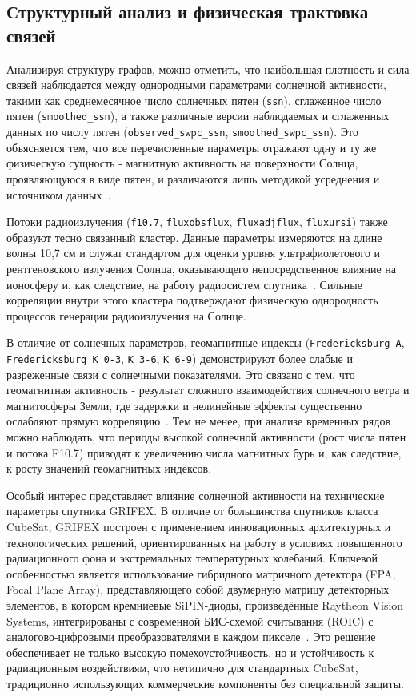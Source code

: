 \subsection{Структурный анализ и физическая трактовка связей}

Анализируя структуру графов, можно отметить, что наибольшая плотность и сила
связей наблюдается между однородными параметрами солнечной активности, такими
как среднемесячное число солнечных пятен (\texttt{ssn}), сглаженное число пятен
(\texttt{smoothed\_ssn}), а также различные версии наблюдаемых и сглаженных
данных по числу пятен (\texttt{observed\_swpc\_ssn},
\texttt{smoothed\_swpc\_ssn}). Это объясняется тем, что все перечисленные
параметры отражают одну и ту же физическую сущность - магнитную активность на
поверхности Солнца, проявляющуюся в виде пятен, и различаются лишь методикой
усреднения и источником данных~\cite{sidc_manual}.

Потоки радиоизлучения (\texttt{f10.7}, \texttt{fluxobsflux},
\texttt{fluxadjflux}, \texttt{fluxursi}) также образуют тесно связанный кластер.
Данные параметры измеряются на длине волны 10,7 см и служат стандартом для
оценки уровня ультрафиолетового и рентгеновского излучения Солнца, оказывающего
непосредственное влияние на ионосферу и, как следствие, на работу радиосистем
спутника~\cite{f107_standard}. Сильные корреляции внутри этого кластера
подтверждают физическую однородность процессов генерации радиоизлучения на
Солнце.

В отличие от солнечных параметров, геомагнитные индексы (\texttt{Fredericksburg
	A}, \texttt{Fredericksburg K 0-3}, \texttt{K 3-6}, \texttt{K 6-9}) демонстрируют
более слабые и разреженные связи с солнечными показателями. Это связано с тем,
что геомагнитная активность - результат сложного взаимодействия солнечного ветра
и магнитосферы Земли, где задержки и нелинейные эффекты существенно ослабляют
прямую корреляцию~\cite{geomag_handbook}. Тем не менее, при анализе временных
рядов можно наблюдать, что периоды высокой солнечной активности (рост числа
пятен и потока F10.7) приводят к увеличению числа магнитных бурь и, как
следствие, к росту значений геомагнитных индексов.

Особый интерес представляет влияние солнечной активности на технические
параметры спутника GRIFEX. В отличие от большинства спутников класса CubeSat,
GRIFEX построен с применением инновационных архитектурных и технологических
решений, ориентированных на работу в условиях повышенного радиационного фона и
экстремальных температурных колебаний. Ключевой особенностью является использование гибридного матричного детектора (FPA, Focal Plane Array), представляющего собой двумерную матрицу детекторных элементов, в котором кремниевые SiPIN-диоды, произведённые Raytheon Vision Systems, интегрированы с современной БИС-схемой считывания (ROIC) с аналогово-цифровыми преобразователями в каждом пикселе~\cite{norton2012spaceborne, eoportal_grifex}.
Это решение обеспечивает
не только высокую помехоустойчивость, но и устойчивость к радиационным
воздействиям, что нетипично для стандартных CubeSat, традиционно использующих
коммерческие компоненты без специальной защиты.

